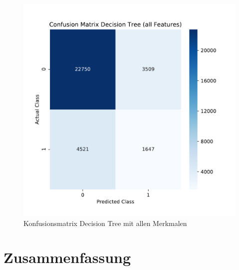 \FloatBarrier
\begin{figure}[!htbp]
\begin{center}
\includegraphics[scale=0.5]{pdf/confusion2.pdf}
\end{center}
\caption{Konfusionsmatrix Decision Tree mit allen Merkmalen}
\label{fig:confusionFinal}
\end{figure}
\FloatBarrier

\chapter{Zusammenfassung}






